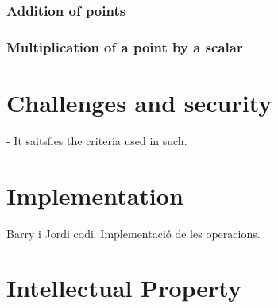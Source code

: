 \documentclass{article}
\begin{document}
	 	\subsubsection{Addition of points} 
	 	\subsubsection{Multiplication of a point by a scalar} 
 
\section{Challenges and security}	
 - It saitsfies the criteria used in such. 
	
\section{Implementation}						
Barry i Jordi codi. Implementació de les operacions.
	
\section {Intellectual Property}	
	
	\cite{generation-baby}

	\newpage
	
	
\end{document}
